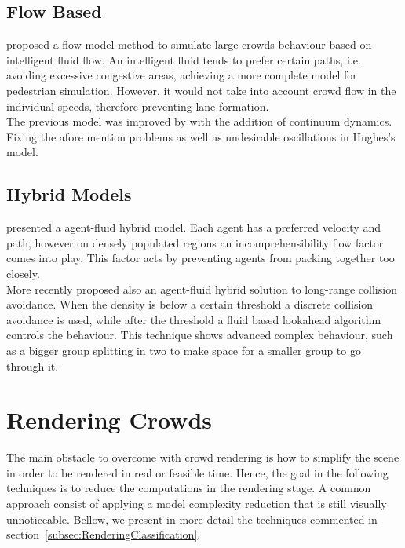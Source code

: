 \documentclass[6pt]{article} %
\begin{document}
\begin{multicols}{2}
\subsection{Flow Based}

\cite{hughes2003} proposed a flow model method to simulate large crowds behaviour based on intelligent fluid flow.
An intelligent fluid tends to prefer certain paths, i.e. avoiding excessive congestive areas, achieving a more complete model for pedestrian simulation.
However, it would not take into account crowd flow in the individual speeds, therefore preventing lane formation.\\

The previous model was improved by \cite{treuille2006} with the addition of continuum dynamics.
Fixing the afore mention problems as well as undesirable oscillations in Hughes's model. 

\subsection{Hybrid Models}

\cite{Narain2009} presented a agent-fluid hybrid model.
Each agent has a preferred velocity and path, however on densely populated regions an incomprehensibility flow factor comes into play.
This factor acts by preventing agents from packing together too closely.\\

More recently \cite{lin2014} proposed also an agent-fluid hybrid solution to long-range collision avoidance.
When the density is below a certain threshold a discrete collision avoidance is used,
while after the threshold a fluid based lookahead algorithm controls the behaviour.
This technique shows advanced complex behaviour, such as a bigger group splitting in two to make space for a smaller group to go through it.

\section{Rendering Crowds}

The main obstacle to overcome with crowd rendering is how to simplify the scene in order to be rendered in real or feasible time.
Hence, the goal in the following techniques is to reduce the computations in the rendering stage.
A common approach consist of applying a model complexity reduction that is still visually unnoticeable.
Bellow, we present in more detail the techniques commented in section~\ref{subsec:RenderingClassification}.


\end{multicols}
\end{document}
